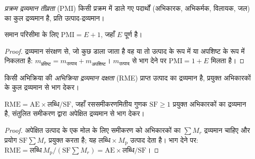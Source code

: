 \begin{definition}[प्रक्रम द्रव्यमान तीव्रता]\label{def:b3:green-industrial:pmi}
\emph{प्रक्रम द्रव्यमान तीव्रता} (PMI) किसी
प्रक्रम में डाले गए पदार्थों (अभिकारक, अभिकर्मक, विलायक,
जल) का कुल द्रव्यमान है, प्रति उत्पाद-द्रव्यमान।
\end{definition}

\begin{proposition}[PMI और E-गुणक]\label{prop:b3:green-industrial:pmi-e}
समान परिसीमा के लिए $\mathrm{PMI} = E + 1$, जहाँ $E$ पूर्ण  है।
\end{proposition}

\begin{proof}
द्रव्यमान संरक्षण से, जो कुछ डाला जाता है वह या तो उत्पाद के रूप में या अपशिष्ट के रूप में निकलता है:
$m_{\text{प्रविष्ट}} = m_{\text{उत्पाद}} + m_{\text{अपशिष्ट}}$। $m_{\text{उत्पाद}}$ से भाग देने पर $\mathrm{PMI} = 1 + E$ मिलता है।
\end{proof}

\begin{definition}[अभिक्रिया द्रव्यमान दक्षता]\label{def:b3:green-industrial:rme}
किसी अभिक्रिया की \emph{अभिक्रिया द्रव्यमान दक्षता} (RME)
प्राप्त उत्पाद का द्रव्यमान है, प्रयुक्त अभिकारकों के कुल द्रव्यमान से
भाग देकर।
\end{definition}

\begin{proposition}\label{prop:b3:green-industrial:rme}
$\mathrm{RME} = \mathrm{AE} \times \text{लब्धि}/\mathrm{SF}$, जहाँ रससमीकरणमितीय गुणक $\mathrm{SF} \ge 1$ प्रयुक्त अभिकारकों का
द्रव्यमान है, संतुलित समीकरण द्वारा अपेक्षित द्रव्यमान से भाग देकर।
\end{proposition}

\begin{proof}
अपेक्षित उत्पाद के एक मोल के लिए समीकरण को अभिकारकों का $\sum M_r$ द्रव्यमान चाहिए और
प्रयोग $\mathrm{SF}\sum M_r$ प्रयुक्त करता है; यह $\text{लब्धि} \times M_{\mathrm p}$ उत्पाद देता है। भाग देने पर:
$\mathrm{RME} = \text{लब्धि}\,M_{\mathrm p}/(\mathrm{SF}\sum M_r) = \mathrm{AE} \times \text{लब्धि}/\mathrm{SF}$।
\end{proof}


